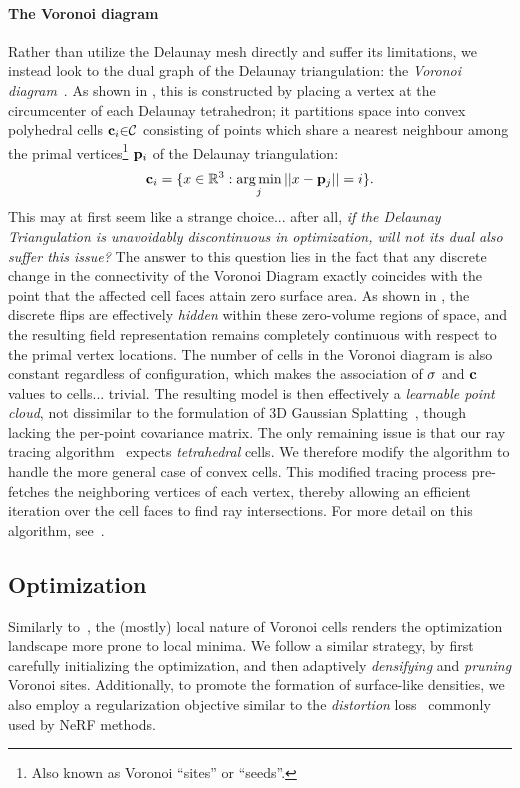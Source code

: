 \paragraph{The Voronoi diagram}
%
Rather than utilize the Delaunay mesh directly and suffer its limitations, we instead look to the dual graph of the Delaunay triangulation: the \emph{Voronoi diagram}~\cite{voronoi}.
As shown in , this is constructed by placing a vertex at the circumcenter of each Delaunay tetrahedron; it partitions space into convex polyhedral cells $\mathbf{c}_i{\in}\mathcal{C}$ consisting of points which share a nearest neighbour among the primal vertices\footnote{Also known as Voronoi ``sites'' or ``seeds''.} $\mathbf{p}_i$ of the Delaunay triangulation:
%
\begin{align}
\mathbf{c}_i = \{x \in \mathbb{R}^3 : \operatorname*{arg\,min}_j ||x - \mathbf{p}_j|| = i\}.\label{eq:voronoi}
\end{align}
% 
This may at first seem like a strange choice... after all, \textit{if the Delaunay Triangulation is unavoidably discontinuous in optimization, will not its dual also suffer this issue?}
% 
\quad The answer to this question lies in the fact that any discrete change in the connectivity of the Voronoi Diagram exactly coincides with the point that the affected cell faces attain zero surface area.
As shown in , the discrete flips are effectively \textit{hidden} within these zero-volume regions of space, and the resulting field representation remains completely continuous with respect to the primal vertex locations.
% 
\quad The number of cells in the Voronoi diagram is also constant regardless of configuration, which makes the association of $\sigma$ and $\mathbf{c}$ values to cells... trivial.
The resulting model is then effectively a \textit{learnable point cloud}, not dissimilar to the formulation of 3D Gaussian Splatting~\cite{gsplat}, though lacking the per-point covariance matrix.
% 
\quad The only remaining issue is that our ray tracing algorithm~\cite{fastray} expects \emph{tetrahedral} cells.
We therefore modify the algorithm to handle the more general case of convex cells.
This modified tracing process pre-fetches the neighboring vertices of each vertex, thereby allowing an efficient iteration over the cell faces to find ray intersections.
For more detail on this algorithm, see~.



\subsection{Optimization}
Similarly to~\citet{gsplat}, the (mostly) local nature of Voronoi cells renders the optimization landscape more prone to local minima.
We follow a similar strategy, by first carefully initializing the optimization, and then adaptively \textit{densifying} and \textit{pruning} Voronoi sites.
Additionally, to promote the formation of surface-like densities, we also employ a regularization objective similar to the \textit{distortion} loss~\cite{mipnerf360} commonly used by NeRF methods.

